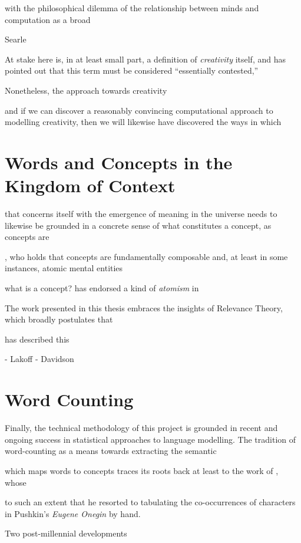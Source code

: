with the philosophical dilemma of the relationship between minds and computation as a broad

Searle

At stake here is, in at least small part, a definition of \emph{creativity} itself, and \cite{Colton} has pointed out that this term must be considered ``essentially contested,''

Nonetheless, the approach towards creativity 

and if we can discover a reasonably convincing computational approach to modelling creativity, then we will likewise have discovered the ways in which 

\section{Words and Concepts in the Kingdom of Context}
that concerns itself with the emergence of meaning in the universe needs to likewise be grounded in a concrete sense of what constitutes a concept, as concepts are

\cite{Fodor}, who holds that concepts are fundamentally composable and, at least in some instances, atomic mental entities

what is a concept?  \cite{Fodor} has endorsed a kind of \emph{atomism} in 

\citep[cf][for a case against conceptual schema in general]{Davidson}

The work presented in this thesis embraces the insights of Relevance Theory, which broadly postulates that 

\cite{Carston} has described this 

- Lakoff
- Davidson



\section{Word Counting}
Finally, the technical methodology of this project is grounded in recent and ongoing success in statistical approaches to language modelling.  The tradition of word-counting as a means towards extracting the semantic 

which maps words to concepts traces its roots back at least to the work of \cite{Markov}, whose

to such an extent that he resorted to tabulating the co-occurrences of characters in Pushkin's \emph{Eugene Onegin} by hand.

Two post-millennial developments 

